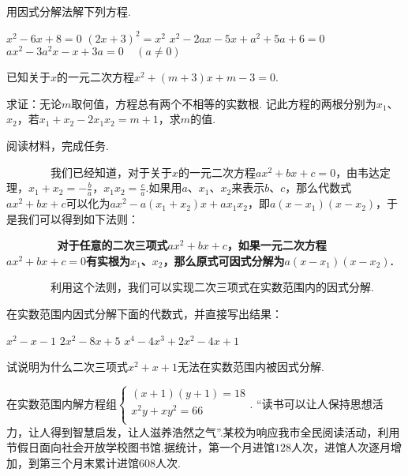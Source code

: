 \documentclass[10pt]{article}
\begin{document}
\begin{questions}{\answeringintroduction}
    \question 用因式分解法解下列方程.
    \begin{subquestions}
        \subquestion $x^2-6x+8=0$
        \subquestion $(2x+3)^2=x^2$
        \subquestion $x^2-2ax-5x+a^2+5a+6=0$
        \subquestion $ax^2-3a^2x-x+3a=0 \ \ \ \ \ (a \neq 0)$
    \end{subquestions}
    \addspace{}
    \question 已知关于$x$的一元二次方程$x^2+(m+3)x+m-3=0$.
    \begin{subquestions}
        \subquestion 求证：无论$m$取何值，方程总有两个不相等的实数根.
        \subquestion 记此方程的两根分别为$x_1$、$x_2$，若$x_1+x_2-2x_1x_2=m+1$，求$m$的值.
    \end{subquestions}
    \addspace{}
    \question 阅读材料，完成任务.\par
    ~~~~~~~~我们已经知道，对于关于$x$的一元二次方程$ax^2+bx+c=0$，由韦达定理，${x_1+x_2=-\frac{b}{a}}$，${x_1x_2=\frac{c}{a}}$.如果用$a$、$x_1$、$x_2$来表示$b$、$c$，那么代数式$ax^2+bx+c$可以化为$ax^2-a(x_1+x_2)x+ax_1x_2$，即$a(x-x_1)(x-x_2)$，于是我们可以得到如下法则：\par
    \textbf{~~~~~~~~对于任意的二次三项式$ax^2+bx+c$，如果一元二次方程$ax^2+bx+c=0$有实根为$x_1$、$x_2$，那么原式可因式分解为$a(x-x_1)(x-x_2)$.}\par
    ~~~~~~~~利用这个法则，我们可以实现二次三项式在实数范围内的因式分解.
    \begin{subquestions}
        \subquestion 在实数范围内因式分解下面的代数式，并直接写出结果：
        \begin{subsubquestions}
            \subsubquestion $x^2-x-1$
            \subsubquestion $2x^2-8x+5$
            \subsubquestion $x^4-4x^3+2x^2-4x+1$
        \end{subsubquestions}
        \subquestion 试说明为什么二次三项式$x^2+x+1$无法在实数范围内被因式分解.
    \end{subquestions}
    \newpage
    \question 在实数范围内解方程组$\left\{ \begin{matrix}
        (x + 1)(y + 1) = 18 \\
        x^{2}y + xy^{2} = 66 \\
        \end{matrix} \right.$.
    \addspace{}
    \question ``读书可以让人保持思想活力，让人得到智慧启发，让人滋养浩然之气''.某校为响应我市全民阅读活动，利用节假日面向社会开放学校图书馆.据统计，第一个月进馆$128$人次，进馆人次逐月增加，到第三个月末累计进馆$608$人次.
    \begin{subquestions}

\end{subquestions}
\end{questions}
\end{document}
